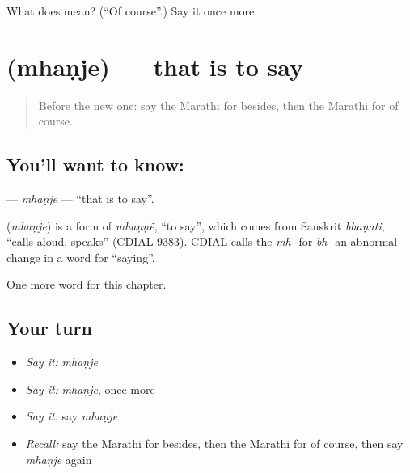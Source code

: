 \begin{tcolorbox}[breakable,colback=teal!4,colframe=teal!35!black,title={Before you move on}]
What does  mean? (\textquotedblleft{}Of course\textquotedblright{}.) Say it once more.
\end{tcolorbox}
\section[\texorpdfstring{\mr{म्हणजे} (mhaṇje)}{म्हणजे (mhaṇje)}]{ (mhaṇje) — that is to say}

\label{lesson:MR-C231-mhanje}



\begin{quote}
Before the new one: say the Marathi for besides, then the Marathi for of course.
\end{quote}

\subsection*{You'll want to know: }
\textbf{} — \emph{mhaṇje} — \textquotedblleft{}that is to say\textquotedblright{}.

\begin{cousinweb}
\textbf{} (\emph{mhaṇje}) is a form of \emph{mhaṇṇẽ}, \textquotedblleft{}to say\textquotedblright{}, which comes from Sanskrit \emph{bhaṇati}, \textquotedblleft{}calls aloud, speaks\textquotedblright{} (CDIAL 9383). CDIAL calls the \emph{mh-} for \emph{bh-} an abnormal change in a word for \textquotedblleft{}saying\textquotedblright{}.
\end{cousinweb}

\begin{grammarlens}[title={What you've built}]
One more word for this chapter.
\end{grammarlens}

\subsection*{Your turn}
\begin{itemize}
\raggedright
  \item \emph{Say it:} \emph{mhaṇje}
  \item \emph{Say it:} \emph{mhaṇje}, once more
  \item \emph{Say it:} say \emph{mhaṇje}
  \item \emph{Recall:} say the Marathi for besides, then the Marathi for of course, then say \emph{mhaṇje} again
\end{itemize}

